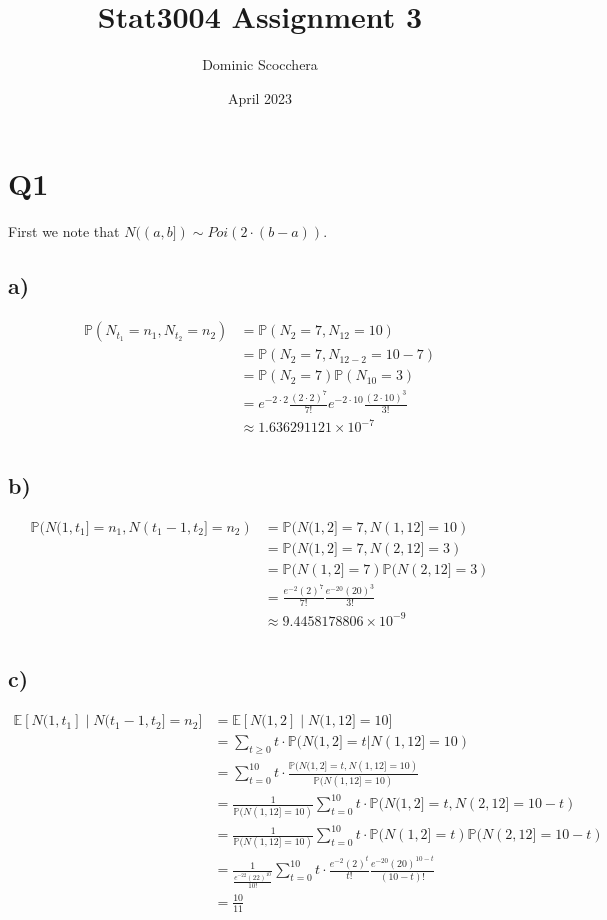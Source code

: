 \documentclass{article}
\title{Stat3004 Assignment 3}
\author{Dominic Scocchera}
\date{April 2023}
\begin{document}
\maketitle
\section*{Q1}
First we note that $N((a,b])\sim Poi(2\cdot(b-a))$.
\subsection*{a)}
\begin{align*}
\mathbb{P}(N_{t_1}=n_1,N_{t_2}=n_2)&=\mathbb{P}(N_{2}=7,N_{12}=10)\\
&=\mathbb{P}(N_2=7,N_{12-2}=10-7)\\
&=\mathbb{P}(N_2=7)\mathbb{P}(N_{10}=3)\\
&=e^{-2\cdot2}\frac{(2\cdot2)^7}{7!}e^{-2\cdot10}\frac{(2\cdot10)^{3}}{3!}\\
&\approx1.636291121\times10^{-7}\\
\end{align*}
\subsection*{b)}
\begin{align*}
\mathbb{P}(N(1, t_1]=n_1, N(t_1-1,t_2]=n_2)&=\mathbb{P}(N(1,2]=7, N(1,12]=10)\\
&=\mathbb{P}(N(1,2]=7, N(2,12]=3)\\
&=\mathbb{P}(N(1,2]=7)\mathbb{P}(N(2,12]=3)\\
&=\frac{e^{-2}(2)^7}{7!}\frac{e^{-20}(20)^3}{3!}\\
&\approx 9.4458178806\times10^{-9}\\
\end{align*}
\subsection*{c)}
\begin{align*}
\mathbb{E}[N(1,t_1]\;|\;N(t_1-1,t_2]=n_2]&=\mathbb{E}[N(1,2]\;|\;N(1,12]=10]\\
&=\sum_{t\geq0}t\cdot\mathbb{P}(N(1,2]=t|N(1,12]=10)\\
&=\sum_{t=0}^{10}t\cdot\frac{\mathbb{P}(N(1,2]=t,N(1,12]=10)}{\mathbb{P}(N(1,12]=10)}\\
&=\frac{1}{\mathbb{P}(N(1,12]=10)}\sum_{t=0}^{10}t\cdot\mathbb{P}(N(1,2]=t,N(2,12]=10-t)\\
&=\frac{1}{\mathbb{P}(N(1,12]=10)}\sum_{t=0}^{10}t\cdot\mathbb{P}(N(1,2]=t)\mathbb{P}(N(2,12]=10-t)\\
&=\frac{1}{\frac{e^{-22}(22)^{10}}{10!}}\sum_{t=0}^{10}t\cdot\frac{e^{-2}(2)^t}{t!}\frac{e^{-20}(20)^{10-t}}{(10-t)!}\\
&=\frac{10}{11}\\
\end{align*}
\end{document}
